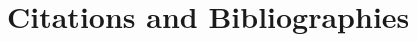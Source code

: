 \documentclass[sigplan,screen]{acmart}
\begin{document}
\section{Citations and Bibliographies}





\appendix
\end{document}
